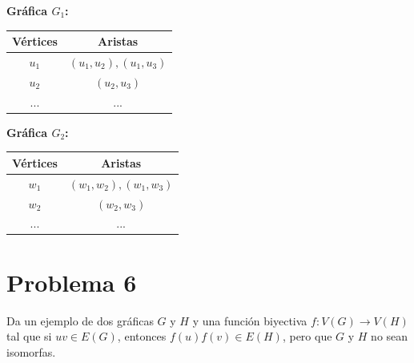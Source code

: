 \documentclass[12pt]{article}
\begin{document}
\begin{enumerate}
	      \vspace{1em} %

	      \textbf{Gráfica \( G_1 \):}
	      \begin{center}
		      \begin{tabular}{|c|c|}
			      \hline
			      Vértices  & Aristas                      \\
			      \hline
			      \( u_1 \) & \( (u_1, u_2), (u_1, u_3) \) \\
			      \( u_2 \) & \( (u_2, u_3) \)             \\
			      ...       & ...                          \\
			      \hline
		      \end{tabular}
	      \end{center}

	      \vspace{1em} %

	      \textbf{Gráfica \( G_2 \):}
	      \begin{center}
		      \begin{tabular}{|c|c|}
			      \hline
			      Vértices  & Aristas                      \\
			      \hline
			      \( w_1 \) & \( (w_1, w_2), (w_1, w_3) \) \\
			      \( w_2 \) & \( (w_2, w_3) \)             \\
			      ...       & ...                          \\
			      \hline
		      \end{tabular}
	      \end{center}

\end{enumerate}


\section*{Problema 6}
Da un ejemplo de dos gráficas \( G \) y \( H \) y una función biyectiva \( f: V(G) \rightarrow V(H) \) tal que si \( uv \in E(G) \), entonces \( f(u)f(v) \in E(H) \), pero que \( G \) y \( H \) no sean isomorfas.
\end{document}
